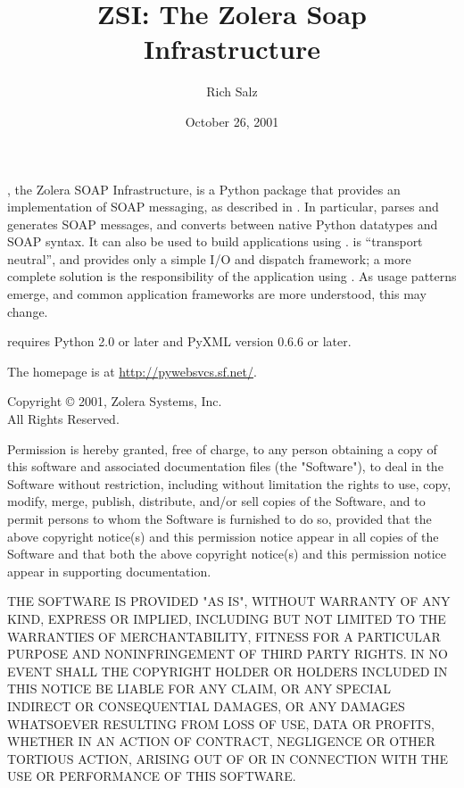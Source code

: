 \documentclass{manual}
\title{ZSI: The Zolera Soap Infrastructure}
\author{Rich Salz}
\date{October 26, 2001}
\begin{document}
\maketitle

\centerline{}

, the Zolera SOAP Infrastructure, is a Python package that
provides an implementation of SOAP messaging, as described in
.
In particular,  parses and generates SOAP messages, and
converts between native Python datatypes and SOAP syntax.
It can also be used to build applications using
.
 is ``transport neutral'', and provides only a simple
I/O and dispatch framework; a more complete solution is the
responsibility of the application using .
As usage patterns emerge, and common application frameworks are
more understood, this may change.

 requires Python 2.0 or later and PyXML version 0.6.6 or later.

The  homepage is at
\url{http://pywebsvcs.sf.net/}.

\vfill

\centerline{}

Copyright \copyright{} 2001, Zolera Systems, Inc.\\
All Rights Reserved.

Permission is hereby granted, free of charge, to any person obtaining a
copy of this software and associated documentation files (the "Software"),
to deal in the Software without restriction, including without limitation
the rights to use, copy, modify, merge, publish, distribute, and/or
sell copies of the Software, and to permit persons to whom the Software
is furnished to do so, provided that the above copyright notice(s) and
this permission notice appear in all copies of the Software and that
both the above copyright notice(s) and this permission notice appear in
supporting documentation.

THE SOFTWARE IS PROVIDED "AS IS", WITHOUT WARRANTY OF ANY KIND,
EXPRESS OR IMPLIED, INCLUDING BUT NOT LIMITED TO THE WARRANTIES OF
MERCHANTABILITY, FITNESS FOR A PARTICULAR PURPOSE AND NONINFRINGEMENT
OF THIRD PARTY RIGHTS. IN NO EVENT SHALL THE COPYRIGHT HOLDER OR HOLDERS
INCLUDED IN THIS NOTICE BE LIABLE FOR ANY CLAIM, OR ANY SPECIAL INDIRECT
OR CONSEQUENTIAL DAMAGES, OR ANY DAMAGES WHATSOEVER RESULTING FROM LOSS
OF USE, DATA OR PROFITS, WHETHER IN AN ACTION OF CONTRACT, NEGLIGENCE
OR OTHER TORTIOUS ACTION, ARISING OUT OF OR IN CONNECTION WITH THE USE
OR PERFORMANCE OF THIS SOFTWARE.
\end{document}
